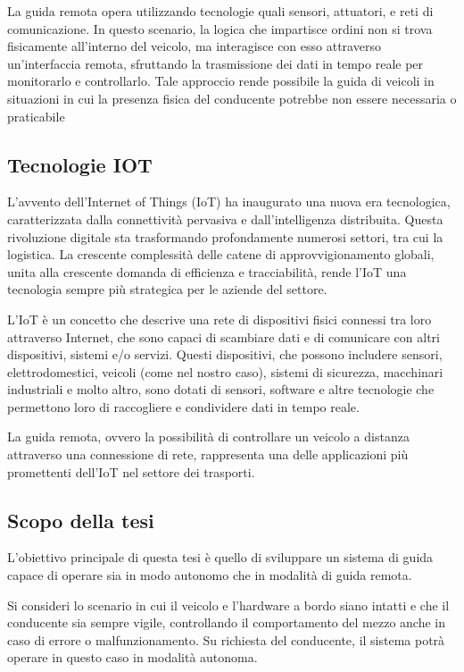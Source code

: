 \noindent La guida remota opera utilizzando tecnologie quali sensori, attuatori, e reti di comunicazione. In questo scenario, la logica che impartisce ordini non si trova fisicamente all'interno del veicolo, ma interagisce con esso attraverso un'interfaccia remota, sfruttando la trasmissione dei dati in tempo reale per monitorarlo e controllarlo. Tale approccio rende possibile la guida di veicoli in situazioni in cui la presenza fisica del conducente potrebbe non essere necessaria o praticabile

\subsection{Tecnologie IOT}
L'avvento dell'Internet of Things (IoT) ha inaugurato una nuova era tecnologica, caratterizzata dalla connettività pervasiva e dall'intelligenza distribuita. Questa rivoluzione digitale sta trasformando profondamente numerosi settori, tra cui la logistica. La crescente complessità delle catene di approvvigionamento globali, unita alla crescente domanda di efficienza e tracciabilità, rende l'IoT una tecnologia sempre più strategica per le aziende del settore.

\noindent L'IoT è un concetto che descrive una rete di dispositivi fisici connessi tra loro attraverso Internet, che sono capaci di scambiare dati e di comunicare con altri dispositivi, sistemi e/o servizi. Questi dispositivi, che possono includere sensori, elettrodomestici, veicoli (come nel nostro caso), sistemi di sicurezza, macchinari industriali e molto altro, sono dotati di sensori, software e altre tecnologie che permettono loro di raccogliere e condividere dati in tempo reale.

\noindent La guida remota, ovvero la possibilità di controllare un veicolo a distanza attraverso una connessione di rete, rappresenta una delle applicazioni più promettenti dell'IoT nel settore dei trasporti.

\subsection{Scopo della tesi}
L'obiettivo principale di questa tesi è quello di sviluppare un sistema di guida capace di operare sia in modo autonomo che in modalità di guida remota.

\noindent Si consideri lo scenario in cui il veicolo e l'hardware a bordo siano intatti e che il conducente sia sempre vigile, controllando il comportamento del mezzo anche in caso di errore o malfunzionamento. Su richiesta del conducente, il sistema potrà operare in questo caso in modalità autonoma.

